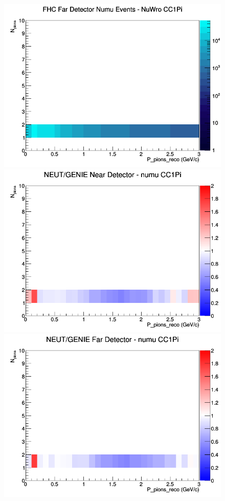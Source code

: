 \documentclass[12pt]{article}
\begin{document}
\begin{figure}[h]
\endminipage
{}
\includegraphics[width=\linewidth]{eff_N_P/FGT/pions/CC1Pi_FHC_FD_numu_N_P_NuWro.png}
\endminipage
\newline
{}
\includegraphics[width=\linewidth]{eff_N_P/FGT/pions/ratios/CC1Pi_NEUT_GENIE_numu_near_N_P.png}
\endminipage
{}
\includegraphics[width=\linewidth]{eff_N_P/FGT/pions/ratios/CC1Pi_NEUT_GENIE_numu_far_N_P.png}

\end{figure}
\end{document}
